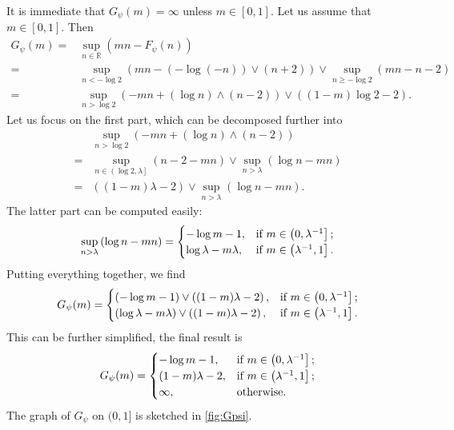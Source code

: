 \begin{example}
It is immediate that $G_{\psi}(m)=\infty$ unless $m\in [0,1]$. Let us assume that $m\in [0,1]$. Then
\[
\begin{aligned}
G_{\psi}(m)=&\sup_{n\in \mathbb{R}} \left( mn-F_{\psi}(n)\right)\\
=& \sup_{n<-\log 2} \left( mn-(-\log (-n))\lor (n+2)\right)  \lor \sup_{n\geq -\log 2} (mn-n-2)\\
=& \sup_{n>\log 2} \left( -mn+(\log n)\land (n-2)\right)  \lor \left((1-m)\log 2-2\right).
\end{aligned}
\]
Let us focus on the first part, which can be decomposed further into
\[
\begin{aligned}
& \sup_{n>\log 2} \left( -mn+(\log n)\land (n-2)\right)\\
=& \sup_{n\in \left(\log 2,\lambda\right]} (n-2-mn) \lor \sup_{n>\lambda} (\log n-mn)\\
=& \left( (1-m)\lambda-2 \right) \lor \sup_{n>\lambda} \left(\log n-mn\right).
\end{aligned}
\]
The latter part can be computed easily:
\[
\sup_{n>\lambda} \left(\log n-mn\right)=
\begin{cases}
    -\log m-1,&\textup{if } m\in \left(0,\lambda^{-1}\right];\\
    \log \lambda -m\lambda,& \textup{if }m\in \left(\lambda^{-1},1\right].
\end{cases}
\]
Putting everything together, we find
\[
G_{\psi}(m)=
\begin{cases}
    (-\log m-1)\lor \left( (1-m)\lambda-2 \right) ,&\textup{if } m\in \left(0,\lambda^{-1}\right];\\
    (\log \lambda -m\lambda)\lor \left( (1-m)\lambda-2 \right),& \textup{if }m\in \left(\lambda^{-1},1\right].
\end{cases}
\]
This can be further simplified, the final result is
\[
G_{\psi}(m)=
\begin{cases}
    -\log m-1 ,&\textup{if } m\in \left(0,\lambda^{-1}\right];\\
    (1-m)\lambda-2 ,& \textup{if }m\in \left(\lambda^{-1},1\right];\\
    \infty,&\textup{otherwise}.
\end{cases}
\]
The graph of $G_{\psi}$ on $(0,1]$ is sketched in \cref{fig:Gpsi}.
\begin{figure}[ht]
\centering
{}
\end{figure}
\end{example}
